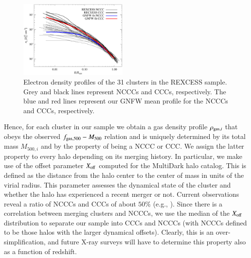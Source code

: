 \documentclass[useAMS,usenatbib]{mn2e}
\begin{document}
\begin{figure} 
\centering
\includegraphics[width=0.48\textwidth]{figures/gas_profiles.eps}
\caption{Electron density profiles of the 31 clusters in the REXCESS sample. Grey and black lines represent 
NCCCs and CCCs, respectively. The blue and red lines represent our GNFW mean profile for the NCCCs and CCCs, respectively.}
\label{fig:gas_profiles}
\end{figure}

Hence, for each cluster in our sample we obtain a gas density profile
$\rho_{{\mathrm{gas}},i}$ that obeys the observed $f_{{\mathrm{gas}},500}-M_{500}$ relation and
is uniquely determined by its total mass $M_{500,i}$ and by the property of being a
NCCC or CCC. We assign the latter property to every halo depending on its
merging history. In particular, we make use of the offset parameter
$X_{{\mathrm{off}}}$ computed for the MultiDark halo catalog. This is defined as the
distance from the halo center to the center of mass in units of the virial
radius. This parameter assesses the dynamical state of the cluster and whether
the halo has experienced a recent merger or not. Current observations reveal a ratio
of NCCCs and CCCs of about $50\%$ (e.g., \citealp{2007A&A...466..805C,
  2009MNRAS.395..764S}). Since there is a correlation between merging clusters
and NCCCs, we use the median of the $X_{{\mathrm{off}}}$ distribution to separate our
sample into CCCs and NCCCs (with NCCCs defined to be those halos with the larger
dynamical offsets). Clearly, this is an over-simplification, and future X-ray
surveys will have to determine this property also as a function of redshift.
\end{document}
